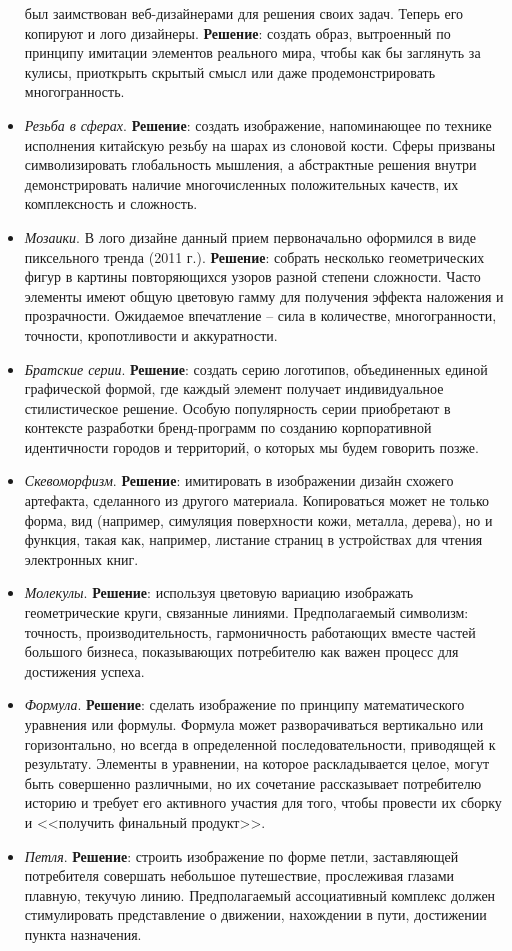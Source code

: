 \begin{itemize}
  был заимствован веб-дизайнерами для решения своих задач. Теперь его копируют и
  лого дизайнеры. \textbf{Решение}: создать образ, вытроенный по принципу имитации элементов
  реального мира, чтобы как бы заглянуть за кулисы, приоткрыть скрытый смысл или даже
  продемонстрировать многогранность.
\item \emph{Резьба в сферах}. \textbf{Решение}: создать изображение,  напоминающее по технике
  исполнения китайскую резьбу на шарах из слоновой кости. Сферы призваны символизировать
  глобальность мышления, а абстрактные решения внутри демонстрировать наличие многочисленных
  положительных качеств, их комплексность и сложность.
\item \emph{Мозаики}. В лого дизайне данный прием первоначально оформился в виде пиксельного
  тренда (2011 г.). \textbf{Решение}: собрать несколько геометрических фигур в картины
  повторяющихся узоров разной степени сложности. Часто элементы имеют общую цветовую гамму для
  получения эффекта наложения и прозрачности. Ожидаемое впечатление -- сила в количестве,
  многогранности, точности, кропотливости и аккуратности.
\item \emph{Братские серии}.  \textbf{Решение}: создать серию логотипов, объединенных единой
  графической формой, где каждый элемент получает индивидуальное стилистическое решение. Особую
  популярность серии приобретают в контексте разработки  бренд-программ по созданию корпоративной
  идентичности городов и территорий, о которых мы будем говорить позже.
\item \emph{Скевоморфизм}. \textbf{Решение}: имитировать в изображении дизайн схожего артефакта,
  сделанного  из другого материала. Копироваться может не только форма, вид (например, симуляция
  поверхности кожи, металла, дерева), но и функция, такая как, например, листание страниц в
  устройствах для чтения электронных книг.
\item \emph{Молекулы}. \textbf{Решение}: используя цветовую вариацию изображать геометрические
  круги, связанные линиями. Предполагаемый символизм: точность, производительность, гармоничность
  работающих вместе частей большого бизнеса, показывающих потребителю как важен процесс для
  достижения успеха.
\item \emph{Формула}. \textbf{Решение}: сделать изображение по принципу математического уравнения
  или формулы. Формула может разворачиваться вертикально или горизонтально, но всегда в
  определенной последовательности, приводящей к результату. Элементы в уравнении, на которое
  раскладывается целое, могут быть совершенно различными, но их сочетание рассказывает потребителю
  историю и требует его активного участия для того, чтобы провести их сборку и <<получить финальный
  продукт>>.
\item \emph{Петля}. \textbf{Решение}: строить изображение по форме петли, заставляющей потребителя
  совершать небольшое путешествие, прослеживая глазами плавную, текучую линию. Предполагаемый
  ассоциативный комплекс должен стимулировать представление о движении, нахождении в пути,
  достижении пункта назначения.
\end{itemize}

